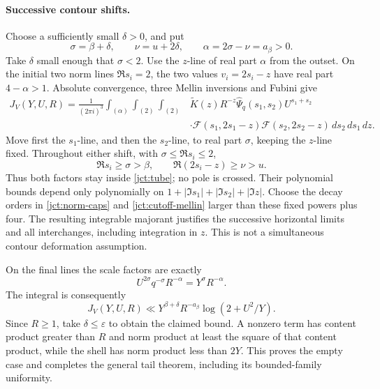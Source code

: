 \paragraph{Successive contour shifts.}
Choose a sufficiently small \(\delta>0\), and put
\[
 \sigma=\beta+\delta,\qquad \nu=u+2\delta,\qquad
 \alpha=2\sigma-\nu=a_\beta>0.
\]
Take \(\delta\) small enough that \(\sigma<2\).
Use the \(z\)-line of real part \(\alpha\) from the outset.
On the initial two norm lines \(\Re s_i=2\), the two values
\(v_i=2s_i-z\) have real part \(4-\alpha>1\).
Absolute convergence, three Mellin inversions and Fubini give
\begin{equation}
\begin{split}
 J_V(Y,U,R)=\frac1{(2\pi i)^3}
 \int_{(\alpha)}\int_{(2)}\int_{(2)}&
 \widetilde K(z)R^{-z}\widehat\Psi_q(s_1,s_2)
 U^{s_1+s_2}\\
 &\cdot\mathcal F(s_1,2s_1-z)
 \mathcal F(s_2,2s_2-z)\,ds_2\,ds_1\,dz.
\end{split}
 \label{jct:triple-inversion}
\end{equation}
Move first the \(s_1\)-line, and then the \(s_2\)-line, to real
part \(\sigma\), keeping the \(z\)-line fixed.  Throughout either
shift, with \(\sigma\le\Re s_i\le2\),
\[
 \Re s_i\ge\sigma>\beta,\qquad
 \Re(2s_i-z)\ge\nu>u.
\]
Thus both factors stay inside \eqref{jct:tube}; no pole is crossed.
Their polynomial bounds depend only polynomially on
\(1+|\Im s_1|+|\Im s_2|+|\Im z|\).
Choose the decay orders in \eqref{jct:norm-caps} and
\eqref{jct:cutoff-mellin} larger than these fixed powers plus four.
The resulting integrable majorant justifies the successive
horizontal limits and all interchanges, including integration in
\(z\).  This is not a simultaneous contour deformation assumption.

On the final lines the scale factors are exactly
\[
 U^{2\sigma}q^{-\sigma}R^{-\alpha}
 =Y^\sigma R^{-\alpha}.
\]
The integral is consequently
\[
 J_V(Y,U,R)\ll Y^{\beta+\delta}
 R^{-a_\beta}\log(2+U^2/Y).
\]
Since \(R\ge1\), take \(\delta\le\varepsilon\) to obtain the
claimed bound.  A nonzero term has content product greater than
\(R\) and norm product at least the square of that content product,
while the shell has norm product less than \(2Y\).
This proves the empty case and completes the general tail theorem,
including its bounded-family uniformity.

